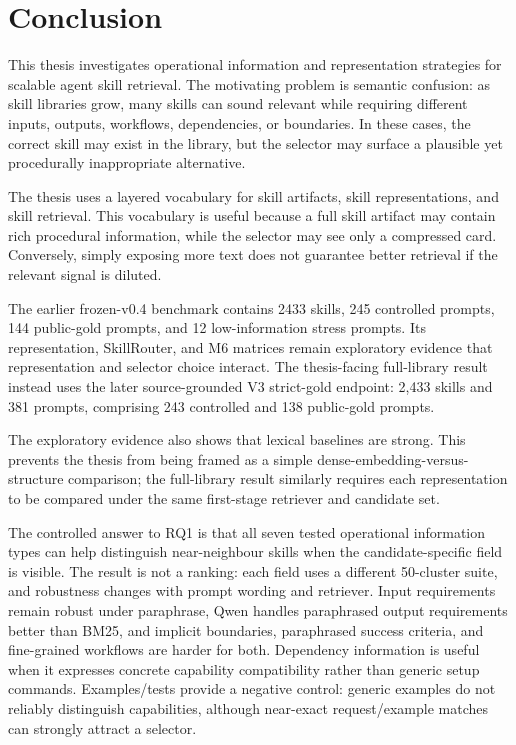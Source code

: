 \chapter{Conclusion}

This thesis investigates operational information and representation strategies for scalable agent skill retrieval. The motivating problem is semantic confusion: as skill libraries grow, many skills can sound relevant while requiring different inputs, outputs, workflows, dependencies, or boundaries. In these cases, the correct skill may exist in the library, but the selector may surface a plausible yet procedurally inappropriate alternative.

The thesis uses a layered vocabulary for skill artifacts, skill representations, and skill retrieval. This vocabulary is useful because a full skill artifact may contain rich procedural information, while the selector may see only a compressed card. Conversely, simply exposing more text does not guarantee better retrieval if the relevant signal is diluted.

The earlier frozen-v0.4 benchmark contains 2433 skills, 245 controlled prompts, 144 public-gold prompts, and 12 low-information stress prompts. Its representation, SkillRouter, and M6 matrices remain exploratory evidence that representation and selector choice interact. The thesis-facing full-library result instead uses the later source-grounded V3 strict-gold endpoint: 2,433 skills and 381 prompts, comprising 243 controlled and 138 public-gold prompts.

The exploratory evidence also shows that lexical baselines are strong. This prevents the thesis from being framed as a simple dense-embedding-versus-structure comparison; the full-library result similarly requires each representation to be compared under the same first-stage retriever and candidate set.

The controlled answer to RQ1 is that all seven tested operational information types can help distinguish near-neighbour skills when the candidate-specific field is visible. The result is not a ranking: each field uses a different 50-cluster suite, and robustness changes with prompt wording and retriever. Input requirements remain robust under paraphrase, Qwen handles paraphrased output requirements better than BM25, and implicit boundaries, paraphrased success criteria, and fine-grained workflows are harder for both. Dependency information is useful when it expresses concrete capability compatibility rather than generic setup commands. Examples/tests provide a negative control: generic examples do not reliably distinguish capabilities, although near-exact request/example matches can strongly attract a selector.

